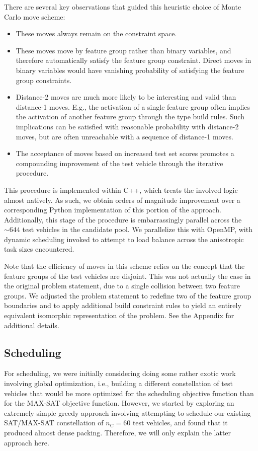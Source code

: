 \documentclass[aps,pra,twocolumn,superscriptaddress,groupedaddress]{revtex4}  %
\begin{document}
There are several key observations that guided this heuristic choice of Monte
Carlo move scheme:
\begin{itemize}
\item These moves always remain on the constraint space.
\item These moves move by feature group rather than binary variables, and
therefore automatically satisfy the feature group constraint. Direct moves in
binary variables would have vanishing probability of satisfying the feature
group constraints.
\item Distance-2 moves are much more likely to be interesting and valid than
distance-1 moves. E.g., the activation of a single feature group often implies
the activation of another feature group through the type build rules. Such
implications can be satisfied with reasonable probability with distance-2 moves,
but are often unreachable with a sequence of distance-1 moves.
\item The acceptance of moves based on increased test set scores promotes a
compounding improvement of the test vehicle through the iterative procedure.
\end{itemize}

This procedure is implemented within C++, which treats the involved logic almost
natively. As such, we obtain orders of magnitude improvement over a
corresponding Python implementation of this portion of the approach.
Additionally, this stage of the procedure is embarrassingly parallel across the
$\sim 644$ test vehicles in the candidate pool. We parallelize this with OpenMP,
with dynamic scheduling invoked to attempt to load balance across the
anisotropic task sizes encountered.

Note that the efficiency of moves in this scheme relies on the concept that the
feature groups of the test vehicles are disjoint. This was not actually the case
in the original problem statement, due to a single collision between two feature
groups. We adjusted the problem statement to redefine two of the feature group
boundaries and to apply additional build constraint rules to yield an entirely
equivalent isomorphic representation of the problem. See the Appendix for
additional details.

\subsection{Scheduling}

For scheduling, we were initially considering doing some rather exotic work
involving global optimization, i.e., building a different constellation of test
vehicles that would be more optimized for the scheduling objective function than
for the MAX-SAT objective function. However, we started by exploring an extremely
simple greedy approach involving attempting to schedule our existing SAT/MAX-SAT
constellation of $n_{\mathrm{C}} = 60$ test vehicles, and found that it produced
almost dense packing. Therefore, we will only explain the latter approach here. 
\end{document}
